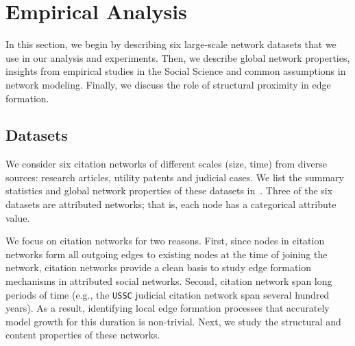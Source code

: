 
\section{Empirical Analysis}
\label{sec:Analysis}

In this section, we begin by describing six large-scale network datasets that we
use in our analysis and experiments. Then, we describe global network properties,
insights from empirical studies in the Social Science and common assumptions in
network modeling. Finally, we discuss the role of structural proximity in edge
formation.

\subsection{Datasets}
\label{sec:Datasets}

We consider six citation networks of different scales (size, time) from diverse
sources: research articles, utility patents and judicial cases. We list the
summary statistics and global network properties of these datasets in~.
Three of the six datasets are attributed networks; that is, each node has a categorical attribute value.

We focus on citation networks for two reasons. First, since nodes in citation networks form
all outgoing edges to existing nodes at the time of joining the network,
citation networks provide a clean basis to study edge formation mechanisms in
attributed social networks. Second, citation network span long periods of time (e.g.,
the \texttt{USSC} judicial citation network span several hundred years).
As a result, identifying local edge formation processes that accurately model
growth for this duration is non-trivial. Next, we study the structural and content
properties of these networks.

